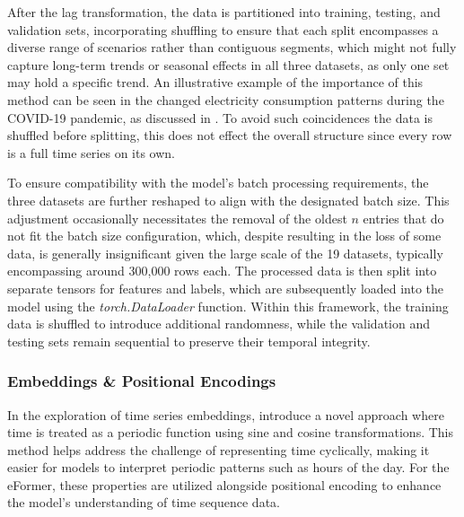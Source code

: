 \documentclass{article}
\begin{document}
After the lag transformation, the data is partitioned into training, testing, and validation sets, incorporating shuffling to ensure that each split encompasses a diverse range of scenarios rather than contiguous segments, which might not fully capture long-term trends or seasonal effects in all three datasets, as only one set may hold a specific trend. An illustrative example of the importance of this method can be seen in the changed electricity consumption patterns during the COVID-19 pandemic, as discussed in \cite{COVID_electric_consumption}. To avoid such coincidences the data is shuffled before splitting, this does not effect the overall structure since every row is a full time series on its own.

To ensure compatibility with the model's batch processing requirements, the three datasets are further reshaped to align with the designated batch size. This adjustment occasionally necessitates the removal of the oldest $n$ entries that do not fit the batch size configuration, which, despite resulting in the loss of some data, is generally insignificant given the large scale of the 19 datasets, typically encompassing around 300,000 rows each. The processed data is then split into separate tensors for features and labels, which are subsequently loaded into the model using the \textit{torch.DataLoader} function. Within this framework, the training data is shuffled to introduce additional randomness, while the validation and testing sets remain sequential to preserve their temporal integrity.


\subsubsection{Embeddings \& Positional Encodings}

In the exploration of time series embeddings, \cite{time2vec} introduce a novel approach where time is treated as a periodic function using sine and cosine transformations. This method helps address the challenge of representing time cyclically, making it easier for models to interpret periodic patterns such as hours of the day. For the eFormer, these properties are utilized alongside positional encoding to enhance the model’s understanding of time sequence data.
\end{document}
